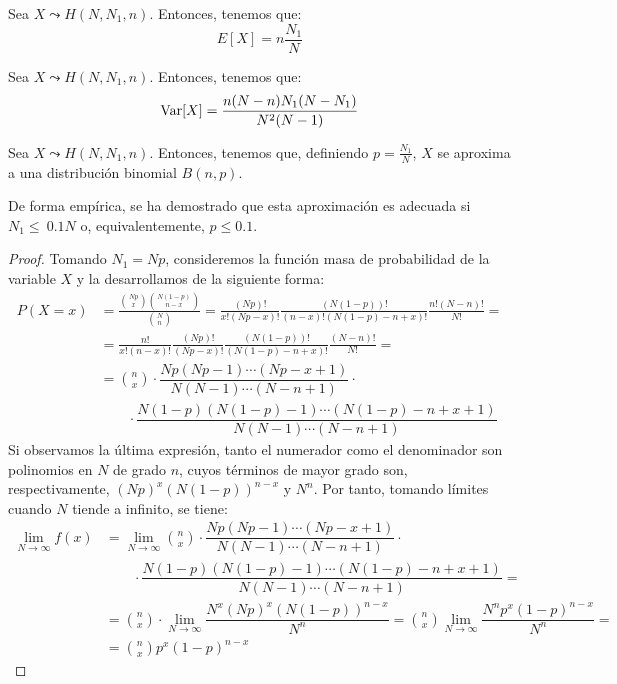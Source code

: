 \begin{prop}
    Sea $X\leadsto H(N,N_1,n)$. Entonces, tenemos que:
    \begin{equation*}
        E[X]= n\frac{N_1}{N}
    \end{equation*}
\end{prop}
\begin{prop}
    Sea $X\leadsto H(N,N_1,n)$. Entonces, tenemos que:
    \begin{equation*}
        \operatorname{Var}[X]=\frac{n(N-n)N_1(N-N_1)}{N^2(N-1)}
    \end{equation*}
\end{prop}


\begin{prop}
    Sea $X\leadsto H(N,N_1,n)$. Entonces, tenemos que, definiendo $p=\frac{N_1}{N}$, $X$ se aproxima a una distribución binomial $B(n,p)$.

    De forma empírica, se ha demostrado que esta aproximación es adecuada si $N_1\leq~0.1N$ o, equivalentemente, $p\leq 0.1$.
    
\end{prop}
\begin{proof}
    Tomando $N_1=Np$, consideremos la función masa de probabilidad de la variable $X$ y la desarrollamos de la siguiente forma:
    \begin{align*}
        P(X=x)
        &= \frac{\binom{Np}{x}\binom{N(1-p)}{n-x}}{\binom{N}{n}}
        = \frac{(Np)!}{x!(Np-x)!}\frac{(N(1-p))!}{(n-x)!(N(1-p)-n+x)!}\frac{n!(N-n)!}{N!} =\\
        &= \frac{n!}{x!(n-x)!}\frac{(Np)!}{(Np-x)!}\frac{(N(1-p))!}{(N(1-p)-n+x)!}\frac{(N-n)!}{N!}=\\
        &= \binom{n}{x} \cdot \dfrac{Np(Np-1)\cdots (Np-x+1)}{N(N-1)\cdots (N-n+1)}
        \cdot \\&\qquad \cdot \dfrac{N(1-p)(N(1-p)-1)\cdots (N(1-p)-n+x+1)}{N(N-1)\cdots (N-n+1)}
    \end{align*}
    Si observamos la última expresión, tanto el numerador como el denominador son polinomios
    en $N$ de grado $n$, cuyos términos de mayor grado son, respectivamente, $(Np)^x(N(1-p))^{n-x}$ y $N^n$. Por tanto, tomando límites cuando $N$ tiende a infinito, se tiene:
    \begin{align*}
        \lim_{N\to \infty}f(x)
        &= \lim_{N\to \infty} \binom{n}{x} \cdot \dfrac{Np(Np-1)\cdots (Np-x+1)}{N(N-1)\cdots (N-n+1)}
        \cdot \\&\qquad \cdot \dfrac{N(1-p)(N(1-p)-1)\cdots (N(1-p)-n+x+1)}{N(N-1)\cdots (N-n+1)}
        =\\&= \binom{n}{x} \cdot \lim_{N\to \infty} \dfrac{N^x(Np)^x(N(1-p))^{n-x}}{N^n}
        = \binom{n}{x} \lim_{N\to \infty} \dfrac{N^np^x(1-p)^{n-x}}{N^n}
        =\\&= \binom{n}{x} p^x(1-p)^{n-x}
    \end{align*}
\end{proof}

